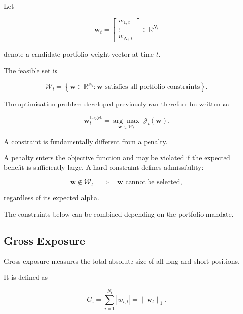 \documentclass[11pt,a4paper]{article}
\begin{document}
Let

\begin{equation}
\mathbf{w}_t
=
\begin{bmatrix}
w_{1,t}\\
\vdots\\
w_{N_t,t}
\end{bmatrix}
\in
\mathbb{R}^{N_t}
\end{equation}

denote a candidate portfolio-weight vector at time $t$.

The feasible set is

\begin{equation}
\boxed{
\mathcal{W}_t
=
\left\{
\mathbf{w}\in\mathbb{R}^{N_t}
:
\mathbf{w}
\text{ satisfies all portfolio constraints}
\right\}.
}
\end{equation}

The optimization problem developed previously can therefore be written as

\begin{equation}
\boxed{
\mathbf{w}_t^{\mathrm{target}}
=
\underset{\mathbf{w}\in\mathcal{W}_t}{\arg\max}
\;
\mathcal{J}_t(\mathbf{w}).
}
\end{equation}

A constraint is fundamentally different from a penalty.

A penalty enters the objective function and may be violated if the expected
benefit is sufficiently large. A hard constraint defines admissibility:

\begin{equation}
\boxed{
\mathbf{w}\notin\mathcal{W}_t
\quad\Rightarrow\quad
\mathbf{w}
\text{ cannot be selected},
}
\end{equation}

regardless of its expected alpha.

The constraints below can be combined depending on the portfolio mandate.


\subsection{Gross Exposure}
\label{subsec:gross_exposure}

Gross exposure measures the total absolute size of all long and short
positions.

It is defined as

\begin{equation}
\boxed{
G_t
=
\sum_{i=1}^{N_t}
|w_{i,t}|
=
\|\mathbf{w}_t\|_1.
}
\end{equation}
\end{document}
